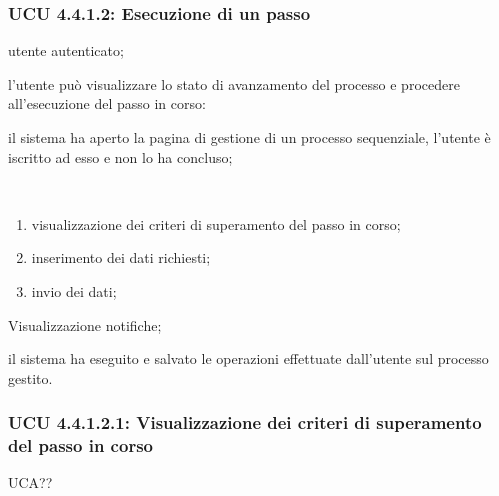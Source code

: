 \subsubsection{UCU 4.4.1.2: Esecuzione di un passo}
\begin{description}[leftmargin=0cm]
\item[Attori:] utente autenticato;
\item[Descrizione:] l'utente può visualizzare lo stato di avanzamento del processo e procedere all'esecuzione del passo in corso:
\item[Precondizione:] il sistema ha aperto la pagina di gestione di un processo sequenziale, l'utente è iscritto ad esso e non lo ha concluso;
\item[Scenario principale:]\
\begin{enumerate}
\item visualizzazione dei criteri di superamento del passo in corso;
\item inserimento dei dati richiesti;
\item invio dei dati;
\end{enumerate}
\item[Inclusioni:] Visualizzazione notifiche;
\item[Postcondizione:] il sistema ha eseguito e salvato le operazioni effettuate dall'utente sul processo gestito.
\end{description}

\subsubsection{UCU 4.4.1.2.1: Visualizzazione dei criteri di superamento del passo in corso} UCA??

